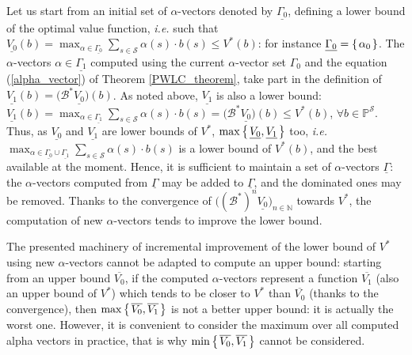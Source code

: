 Let us start from an initial set of $\alpha$-vectors 
denoted by $\underline{\Gamma_0}$, defining a lower bound of the optimal value function,
\textit{i.e.} such that $\underline{V_0}(b) 
= \max_{\alpha \in \underline{\Gamma_0}} \sum_{s \in \mathcal{S}} \alpha(s) \cdot b(s) \leqslant V^*(b)$: 
for instance $\underline{\Gamma_0} = \left\{ \left.  \alpha_0  \right. \right\}$. 
The $\alpha$-vectors $\alpha \in \underline{\Gamma_1}$ computed using the 
current $\alpha$-vector set $\Gamma_0$
and the equation (\ref{alpha_vector}) of Theorem \ref{PWLC_theorem},
take part in the definition of $\underline{V_1}(b) = \Big( \mathcal{B}^* \underline{V_0} \Big)(b)$.
As noted above, $\underline{V_1}$ is also a lower bound: $\underline{V_1}(b) 
= \max_{\alpha \in \underline{\Gamma_1}} \sum_{s \in \mathcal{S}} \alpha(s) \cdot b(s) 
= \Big( \mathcal{B}^* \underline{V_0} \Big) (b) \leqslant V^*(b)$, 
$\forall b \in \mathbb{P}^{\mathcal{S}}$.
Thus, as $\underline{V_0}$ and $\underline{V_1}$
are lower bounds of $V^*$, $\max \left\{ \left. \underline{V_0}, \underline{V_1} \right. \right\}$ too,
\textit{i.e.} $\max_{\alpha \in \underline{\Gamma_0} \cup \underline{\Gamma_1}} \sum_{s \in \mathcal{S}} \alpha(s) \cdot b(s)$
is a lower bound of $V^*(b)$, and the best available at the moment.
Hence, it is sufficient to maintain a set of $\alpha$-vectors $\underline{\Gamma}$:
the $\alpha$-vectors computed from $\underline{\Gamma}$ may be added to $\underline{\Gamma}$, 
and the dominated ones may be removed.
Thanks to the convergence of $\Big( (\mathcal{B}^*)^n \underline{V_0} \Big)_{n \in \mathbb{N}}$ towards $V^*$, 
the computation of new $\alpha$-vectors tends to improve the lower bound.

The presented machinery of incremental improvement
of the lower bound of $V^*$
using new $\alpha$-vectors 
cannot be adapted to compute an upper bound:
starting from an upper bound $\overline{V_0}$,
if the computed $\alpha$-vectors represent
a function $\overline{V_1}$ (also an upper bound of $V^*$)
which tends to be closer to $V^*$ than $\overline{V_0}$ (thanks to the convergence), 
then $\max \left\{ \left.  \overline{V_0}, \overline{V_1}   \right. \right\}$
is not a better upper bound: 
it is actually the worst one.
However, it is convenient to consider the maximum
over all computed alpha vectors in practice,
that is why $\min \left\{ \left.  \overline{V_0}, \overline{V_1}  \right. \right\}$
cannot be considered.

